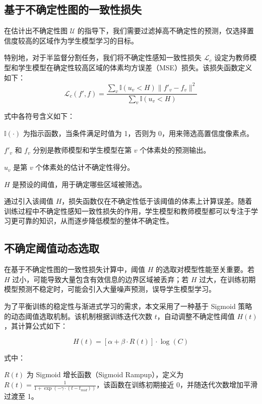 \documentclass{xduugthesis}
\begin{document}
\subsection{基于不确定性图的一致性损失}

在估计出不确定性图 $\mathcal{U}$ 的指导下，我们需要过滤掉高不确定性的预测，仅选择置信度较高的区域作为学生模型学习的目标。

特别地，对于半监督分割任务，我们将不确定性感知一致性损失 $\mathcal{L}_c$ 设定为教师模型和学生模型在确定性较高区域的体素均方误差（MSE）损失。该损失函数定义如下：
\begin{equation}
    \mathcal{L}_c(f', f) = \frac{\sum_{v} \mathbb{I}(u_v < H) \| f'_v - f_v \|^2}{\sum_{v} \mathbb{I}(u_v < H)}
\end{equation}

式中各符号含义如下：

$\mathbb{I}(\cdot)$ 为指示函数，当条件满足时值为 1，否则为 0，用来筛选高置信度像素点。

$f'_v$ 和 $f_v$ 分别是教师模型和学生模型在第 $v$ 个体素处的预测输出。

$u_v$ 是第 $v$ 个体素处的估计不确定性得分。

$H$ 是预设的阈值，用于确定哪些区域被筛选。

通过引入该阈值 $H$，损失函数仅在不确定性低于该阈值的体素上计算误差。随着训练过程中不确定性感知一致性损失的作用，学生模型和教师模型都可以专注于学习更可靠的知识，从而逐步降低模型的整体不确定性。

\subsection{不确定阈值动态选取}
\label{subsec:dynamic_threshold}

在基于不确定性图的一致性损失计算中，阈值 $H$ 的选取对模型性能至关重要。若 $H$ 过小，可能导致大量包含有效信息的边界区域被丢弃；若 $H$ 过大，在训练初期模型预测不稳定时，可能会引入大量噪声预测，误导学生模型学习。

为了平衡训练的稳定性与渐进式学习的需求，本文采用了一种基于 Sigmoid 策略的动态阈值选取机制。该机制根据训练迭代次数 $t$，自动调整不确定性阈值 $H(t)$，其计算公式如下：

\begin{equation}
    H(t) = \left[ \alpha + \beta \cdot R(t) \right] \cdot \log(C)
\end{equation}

式中：

$R(t)$ 为 Sigmoid 增长函数（Sigmoid Rampup），定义为 $R(t) = \frac{1}{1 + \exp(-\gamma \cdot (t - t_{mid}))}$，该函数在训练初期接近 0，并随迭代次数增加平滑过渡至 1。
\end{document}

